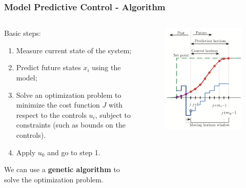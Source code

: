 \documentclass{beamer}
\begin{document}
		\begin{frame}
				\frametitle{Model Predictive Control - Algorithm}
				
			\begin{columns} 
				\begin{column}{.52\textwidth}
					Basic steps:
					\begin{enumerate}
						\item Measure current state of the system;
						\item Predict future states $x_i$ using the model;
						\item Solve an optimization problem to minimize the cost function $J$ with respect to the controls $u_i$, subject to constraints (such as bounds on the controls).
						\item Apply $u_0$ and go to step 1.
					\end{enumerate}
					\vspace{5mm}
					We can use a \textbf{genetic algorithm} to solve the optimization problem.
				\end{column}
				\begin{column}{.52\textwidth}
					\begin{figure}
						\centering
						\includegraphics[scale=0.35]{images/mpc_intro}
						\label{fig:mpcintro}
					\end{figure}
				\end{column}
				
			\end{columns}
				
			
			
			
			
		\end{frame}
	
\end{document}
